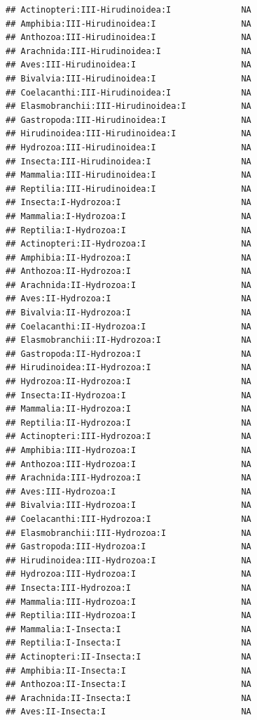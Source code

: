 \documentclass[
  12pt,
]{article}
\begin{document}
\begin{verbatim}
## Actinopteri:III-Hirudinoidea:I              NA
## Amphibia:III-Hirudinoidea:I                 NA
## Anthozoa:III-Hirudinoidea:I                 NA
## Arachnida:III-Hirudinoidea:I                NA
## Aves:III-Hirudinoidea:I                     NA
## Bivalvia:III-Hirudinoidea:I                 NA
## Coelacanthi:III-Hirudinoidea:I              NA
## Elasmobranchii:III-Hirudinoidea:I           NA
## Gastropoda:III-Hirudinoidea:I               NA
## Hirudinoidea:III-Hirudinoidea:I             NA
## Hydrozoa:III-Hirudinoidea:I                 NA
## Insecta:III-Hirudinoidea:I                  NA
## Mammalia:III-Hirudinoidea:I                 NA
## Reptilia:III-Hirudinoidea:I                 NA
## Insecta:I-Hydrozoa:I                        NA
## Mammalia:I-Hydrozoa:I                       NA
## Reptilia:I-Hydrozoa:I                       NA
## Actinopteri:II-Hydrozoa:I                   NA
## Amphibia:II-Hydrozoa:I                      NA
## Anthozoa:II-Hydrozoa:I                      NA
## Arachnida:II-Hydrozoa:I                     NA
## Aves:II-Hydrozoa:I                          NA
## Bivalvia:II-Hydrozoa:I                      NA
## Coelacanthi:II-Hydrozoa:I                   NA
## Elasmobranchii:II-Hydrozoa:I                NA
## Gastropoda:II-Hydrozoa:I                    NA
## Hirudinoidea:II-Hydrozoa:I                  NA
## Hydrozoa:II-Hydrozoa:I                      NA
## Insecta:II-Hydrozoa:I                       NA
## Mammalia:II-Hydrozoa:I                      NA
## Reptilia:II-Hydrozoa:I                      NA
## Actinopteri:III-Hydrozoa:I                  NA
## Amphibia:III-Hydrozoa:I                     NA
## Anthozoa:III-Hydrozoa:I                     NA
## Arachnida:III-Hydrozoa:I                    NA
## Aves:III-Hydrozoa:I                         NA
## Bivalvia:III-Hydrozoa:I                     NA
## Coelacanthi:III-Hydrozoa:I                  NA
## Elasmobranchii:III-Hydrozoa:I               NA
## Gastropoda:III-Hydrozoa:I                   NA
## Hirudinoidea:III-Hydrozoa:I                 NA
## Hydrozoa:III-Hydrozoa:I                     NA
## Insecta:III-Hydrozoa:I                      NA
## Mammalia:III-Hydrozoa:I                     NA
## Reptilia:III-Hydrozoa:I                     NA
## Mammalia:I-Insecta:I                        NA
## Reptilia:I-Insecta:I                        NA
## Actinopteri:II-Insecta:I                    NA
## Amphibia:II-Insecta:I                       NA
## Anthozoa:II-Insecta:I                       NA
## Arachnida:II-Insecta:I                      NA
## Aves:II-Insecta:I                           NA

\end{verbatim}
\end{document}
